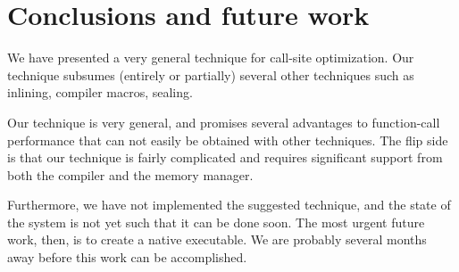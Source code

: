 \section{Conclusions and future work}

We have presented a very general technique for call-site optimization.
Our technique subsumes (entirely or partially) several other
techniques such as inlining, compiler macros, sealing.

Our technique is very general, and promises several advantages to
function-call performance that can not easily be obtained with other
techniques.  The flip side is that our technique is fairly complicated
and requires significant support from both the compiler and the memory
manager.

Furthermore, we have not implemented the suggested technique, and the
state of the \sicl{} system is not yet such that it can be done soon.
The most urgent future work, then, is to create a native \sicl{}
executable.  We are probably several months away before this work can
be accomplished.
